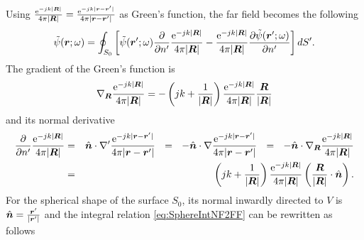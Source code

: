 \par Using $\frac{\mrm{e}^{-jk|\mbfit{R}|}}{4\pi|\mbfit{R}|} = \frac{\mrm{e}^{-jk|\mbfit{r}-\mbfit{r'}|}}{4\pi|\mbfit{r}-\mbfit{r'}|}$ as Green's function, the far field becomes the following
\begin{equation}
\label{eq:SphereIntNF2FF}
\tilde{\psi}(\mbfit{r}; \omega) = \oint_{S_0} \left [  \tilde{\psi}(\mbfit{r'}; \omega) \frac{ \partial{}} {\partial{n'}} \frac{\mrm{e}^{-jk|\mbfit{R}|}}{4\pi|\mbfit{R}|}  -  \frac{\mrm{e}^{-jk|\mbfit{R}|}}{4\pi|\mbfit{R}|} \frac{\partial{\tilde{\psi}(\mbfit{r'}; \omega)}}{\partial{n'}} \right ] dS'.
\end{equation} The gradient of the Green's function is
\begin{equation}
\nabla_{\mbfit{R}} \frac{\mrm{e}^{-jk|\mbfit{R}|}}{4\pi|\mbfit{R}|} = - \left ( jk + \frac{1}{|\mbfit{R}|} \right ) \frac{\mrm{e}^{-jk|\mbfit{R}|}}{4\pi|\mbfit{R}|} \frac{\mbfit{R}}{|\mbfit{R}|}
\end{equation} and its normal derivative
\begin{eqnarray}
\frac{ \partial{}} {\partial{n'}} \frac{\mrm{e}^{-jk|\mbfit{R}|}}{4\pi|\mbfit{R}|} &= & \hat{\mbfit{n}} \cdot {\nabla}' \frac{\mrm{e}^{-jk|\mbfit{r}-\mbfit{r'}|}}{4\pi|\mbfit{r}-\mbfit{r'}|} \ \ = \ \ - \hat{\mbfit{n}} \cdot {\nabla} \frac{\mrm{e}^{-jk|\mbfit{r}-\mbfit{r'}|}}{4\pi|\mbfit{r}-\mbfit{r'}|} \ \ = \ \ - \hat{\mbfit{n}} \cdot \nabla_{\mbfit{R}} \frac{\mrm{e}^{-jk|\mbfit{R}|}}{4\pi|\mbfit{R}|} \nonumber \\
&= &  \left ( jk + \frac{1}{|\mbfit{R}|} \right )  \frac{\mrm{e}^{-jk|\mbfit{R}|}}{4\pi|\mbfit{R}|} \left ( \frac{\mbfit{R}}{|\mbfit{R}|} \cdot \hat{\mbfit{n}} \right ).
\end{eqnarray} For the spherical shape of the surface $S_0$, its normal inwardly directed to $V$ is $\hat{\mbfit{n}} = \frac{\mbfit{r'}}{|\mbfit{r'}|} $ and the integral relation \eqref{eq:SphereIntNF2FF} can be rewritten as follows
